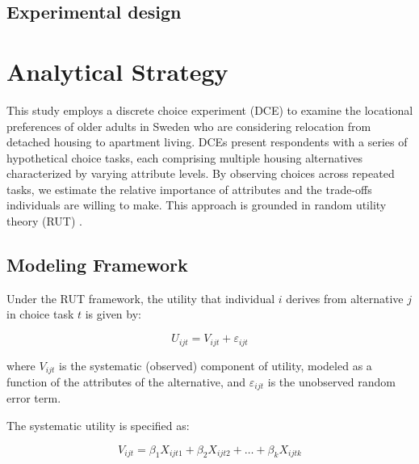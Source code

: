 \documentclass[3p,11pt ]{elsarticle}
\begin{document}



\newpage

\subsection{Experimental design}
\section{Analytical Strategy}

This study employs a discrete choice experiment (DCE) to examine the locational preferences of older adults in Sweden who are considering relocation from detached housing to apartment living. DCEs present respondents with a series of hypothetical choice tasks, each comprising multiple housing alternatives characterized by varying attribute levels. By observing choices across repeated tasks, we estimate the relative importance of attributes and the trade-offs individuals are willing to make. This approach is grounded in random utility theory (RUT) \citep{lancsarConductingDiscreteChoice2008}.

\subsection{Modeling Framework}

Under the RUT framework, the utility that individual \( i \) derives from alternative \( j \) in choice task \( t \) is given by:

\begin{equation}
U_{ijt} = V_{ijt} + \varepsilon_{ijt}
\end{equation}

\noindent where \( V_{ijt} \) is the systematic (observed) component of utility, modeled as a function of the attributes of the alternative, and \( \varepsilon_{ijt} \) is the unobserved random error term.

The systematic utility is specified as:

\begin{equation}
V_{ijt} = \beta_1 X_{ijt1} + \beta_2 X_{ijt2} + \ldots + \beta_k X_{ijtk}
\end{equation}
\end{document}

